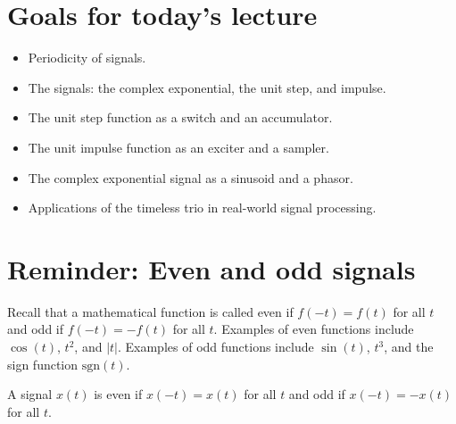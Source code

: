 \section{Goals for today's lecture}
\begin{itemize}
    \item Periodicity of signals. 
    \item The signals: the complex exponential, the unit step, and impulse.
    \item The unit step function as a switch and an accumulator.
    \item The unit impulse function as an exciter and a sampler.
    \item The complex exponential signal as a sinusoid and a phasor.
    \item Applications of the timeless trio in real-world signal processing.
\end{itemize}

\section{Reminder: Even and odd signals}
Recall that a mathematical function is called even if $f(-t)=f(t)$ for all $t$ and odd if $f(-t)=-f(t)$ for all $t$. Examples of even functions include $\cos(t)$, $t^2$, and $|t|$. Examples of odd functions include $\sin(t)$, $t^3$, and the sign function $\text{sgn}(t)$.
\begin{definition} A signal $x(t)$ is even if $x(-t)=x(t)$ for all $t$ and odd if $x(-t)=-x(t)$ for all $t$.
\end{definition}

